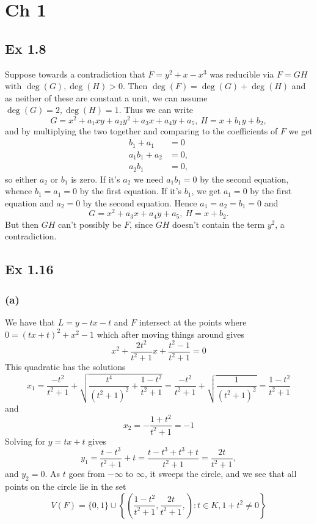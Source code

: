 \documentclass{article}
\theoremstyle{definition}
\begin{document}
\section*{Ch 1}

\subsection*{Ex 1.8}
Suppose towards a contradiction that $F = y^{2} + x - x^{3}$ was reducible via
$F = GH$ with $\deg(G), \deg(H) > 0$. Then $\deg(F) = \deg(G) + \deg(H)$ and as
neither of these are constant a unit, we can assume $\deg(G) = 2, \deg(H) = 1$.
Thus we can write
\[
	G = x^{2} + a_1 xy + a_2 y^{2} + a_3 x + a_4 y + a_5,\ 
	H = x + b_1 y + b_2,
\] 
and by multiplying the two together and comparing to the coefficients of $F$ we get
\begin{align*}
	b_1 + a_1 &= 0 \\
	a_1 b_1 + a_2 &= 0, \\
	a_2 b_1 &= 0,
\end{align*}
so either $a_2$ or $b_1$ is zero. If it's $a_2$ we need $a_1b_1 = 0$ by the
second equation, whence $b_1 = a_1 = 0$ by the first equation. If it's $b_1$,
we get $a_1=0$ by the first equation and $a_2 = 0$ by the second equation.
Hence $a_1 = a_2 = b_1 = 0$ and
\[
	G = x^{2} + a_3 x + a_4 y + a_5,\ 
	H = x + b_2.
\] 
But then $GH$ can't possibly be $F$, since $GH$ doesn't contain the term
$y^{2}$, a contradiction.

\subsection*{Ex 1.16}
\subsubsection*{(a)}

We have that $L = y - tx - t$ and $F$ intersect at the points where
$0 = (tx + t)^{2} + x^{2} - 1$
which after moving things around gives
\[
	x^{2} + \frac{2t^{2}}{t^{2} + 1}x + \frac{t^{2} - 1}{t^{2} + 1} = 0
\] 
This quadratic has the solutions 
\[
	x_1 
	= 
	\frac{-t^{2}}{t^{2} + 1} + \sqrt{\frac{t^{4}}{(t^{2} + 1)^{2}} + \frac{1 - t^{2}}{t^{2} + 1}} 
	= 
	\frac{-t^{2}}{t^{2} + 1} + \sqrt{\frac{1}{(t^{2} + 1)^{2}}}
	= 
	\frac{1 - t^{2}}{t^{2} + 1}
\] 
and
\[
	x_2 
	= 
	-\frac{1 + t^{2}}{t^{2} + 1}
	=
	-1
\] 
Solving for $y = tx + t$ gives
\[
	y_1 
	= 
	\frac{t - t^{3}}{t^{2} + 1} + t
	= 
	\frac{t - t^{3} + t^{3} + t}{t^{2} + 1}
	=
	\frac{2t}{t^{2} + 1},
\] 
and $y_2 = 0$. As $t$ goes from $-\infty$ to $\infty$, it sweeps the circle,
and we see that all points on the circle lie in the set
\[
	V(F) 
	= 
	\{0, 1\} 
	\cup 
	\left\{
		\left(
			\frac{1 - t^{2}}{t^{2} + 1}, 
			\frac{2t}{t^{2} + 1},
		\right)
		:
		t \in K, 1 + t^{2} \not = 0
	\right\}
\]
\end{document}
